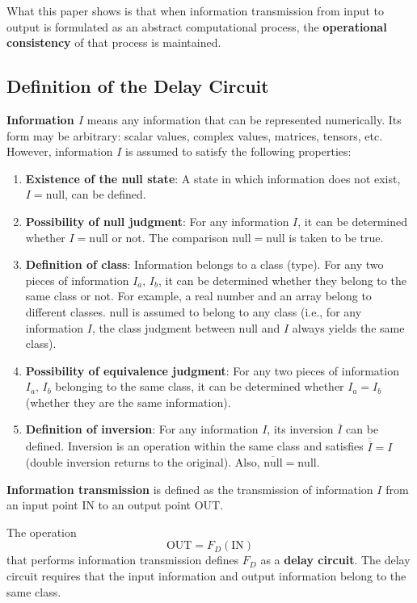 \documentclass[12pt,a4paper]{article}
\begin{document}
What this paper shows is that when information transmission from input to output is formulated as an abstract computational process, the \textbf{operational consistency} of that process is maintained.

\subsection{Definition of the Delay Circuit}

\textbf{Information $I$} means any information that can be represented numerically. Its form may be arbitrary: scalar values, complex values, matrices, tensors, etc. However, information $I$ is assumed to satisfy the following properties:

\begin{enumerate}
  \item \textbf{Existence of the null state}: A state in which information does not exist, $I = \mathrm{null}$, can be defined.
  \item \textbf{Possibility of null judgment}: For any information $I$, it can be determined whether $I = \mathrm{null}$ or not. The comparison $\mathrm{null} = \mathrm{null}$ is taken to be true.
  \item \textbf{Definition of class}: Information belongs to a class (type). For any two pieces of information $I_a,\, I_b$, it can be determined whether they belong to the same class or not. For example, a real number and an array belong to different classes. $\mathrm{null}$ is assumed to belong to any class (i.e., for any information $I$, the class judgment between $\mathrm{null}$ and $I$ always yields the same class).
  \item \textbf{Possibility of equivalence judgment}: For any two pieces of information $I_a,\, I_b$ belonging to the same class, it can be determined whether $I_a = I_b$ (whether they are the same information).
  \item \textbf{Definition of inversion}: For any information $I$, its inversion $\overline{I}$ can be defined. Inversion is an operation within the same class and satisfies $\overline{\overline{I}} = I$ (double inversion returns to the original). Also, $\overline{\mathrm{null}} = \mathrm{null}$.
\end{enumerate}

\textbf{Information transmission} is defined as the transmission of information $I$ from an input point $\mathrm{IN}$ to an output point $\mathrm{OUT}$.

The operation
\begin{equation}
  \mathrm{OUT} = F_D(\mathrm{IN})
\end{equation}
that performs information transmission defines $F_D$ as a \textbf{delay circuit}. The delay circuit requires that the input information and output information belong to the same class.
\end{document}
